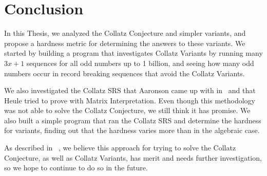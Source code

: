 \chapter{Conclusion} \label{sec:conclusion}
In this Thesis, we analyzed the Collatz Conjecture and simpler variants, and propose a hardness metric for determining the answers to these variants. We started by building a program that investigates Collatz Variants by running many $3x+1$ sequences for all odd numbers up to 1 billion, and seeing how many odd numbers occur in record breaking sequences that avoid the Collatz Variants. \par
We also investigated the Collatz SRS that Aaronson came up with in~\cite{HeuleAaronson} and that Heule tried to prove with Matrix Interpretation. Even though this methodology was not able to solve the Collatz Conjecture, we still think it has promise. We also built a simple program that ran the Collatz SRS and determine the hardness for variants, finding out that the hardness varies more than in the algebraic case.\par
As described in ~\cite{HeuleAaronson}, we believe this approach for trying to solve the Collatz Conjecture, as well as Collatz Variants, has merit and needs further investigation, so we hope to continue to do so in the future.